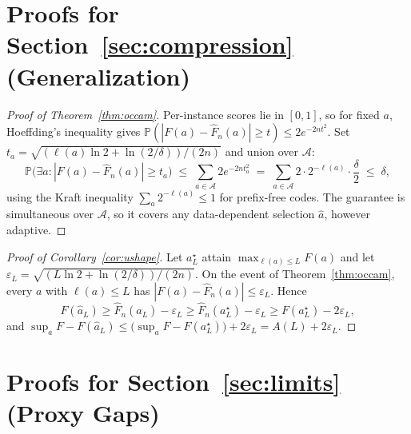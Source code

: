 \documentclass{article}
\theoremstyle{plain}
\theoremstyle{definition}
\theoremstyle{remark}
\newcommand{\A}{\mathcal{A}}
\renewcommand{\P}{\mathbb{P}}
\newcommand{\len}{\ell}
\newcommand{\Fhat}{\widehat{F}}
\newcommand{\eps}{\varepsilon}
\begin{document}
\section{Proofs for Section~\ref{sec:compression} (Generalization)}
\label{app:occam}

\begin{proof}[Proof of Theorem~\ref{thm:occam}]
Per-instance scores lie in $[0,1]$, so for fixed $a$, Hoeffding's inequality \citep{hoeffding1963probability} gives $\P(|F(a) - \Fhat_n(a)| \ge t) \le 2e^{-2nt^2}$. Set $t_a = \sqrt{(\len(a)\ln 2 + \ln(2/\delta))/(2n)}$ and union over $\A$:
\[
\P\Big(\exists a : |F(a) - \Fhat_n(a)| \ge t_a\Big)
\;\le\; \sum_{a \in \A} 2 e^{-2n t_a^2}
\;=\; \sum_{a \in \A} 2 \cdot 2^{-\len(a)} \cdot \frac{\delta}{2}
\;\le\; \delta,
\]
using the Kraft inequality $\sum_a 2^{-\len(a)} \le 1$ for prefix-free codes. The guarantee is simultaneous over $\A$, so it covers any data-dependent selection $\hat{a}$, however adaptive.
\end{proof}

\begin{proof}[Proof of Corollary~\ref{cor:ushape}]
Let $a^\star_L$ attain $\max_{\len(a) \le L} F(a)$ and let $\eps_L = \sqrt{(L \ln 2 + \ln(2/\delta))/(2n)}$. On the event of Theorem~\ref{thm:occam}, every $a$ with $\len(a) \le L$ has $|F(a) - \Fhat_n(a)| \le \eps_L$. Hence
\[
F(\hat{a}_L) \ge \Fhat_n(\hat{a}_L) - \eps_L \ge \Fhat_n(a^\star_L) - \eps_L \ge F(a^\star_L) - 2\eps_L ,
\]
and $\sup_a F - F(\hat a_L) \le \big(\sup_a F - F(a^\star_L)\big) + 2\eps_L = A(L) + 2\eps_L$.
\end{proof}

\section{Proofs for Section~\ref{sec:limits} (Proxy Gaps)}
\label{app:goodhart}
\end{document}
